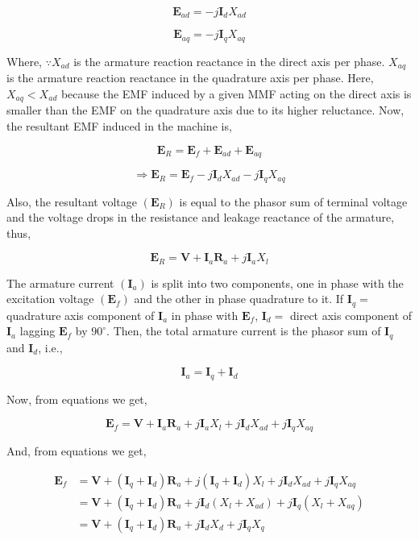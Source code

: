 \documentclass[main.tex]{subfiles}
\begin{document}
\begin{enumerate}
$$
\boldsymbol{E}_{a d}=-j \boldsymbol{I}_d X_{a d} 
$$

$$
\boldsymbol{E}_{a q}=-j \boldsymbol{I}_q X_{a q} 
$$

Where, $\because X_{a d}$ is the armature reaction reactance in the direct axis per phase.
$X_{a q}$ is the armature reaction reactance in the quadrature axis per phase.
Here, $X_{a q}<X_{a d}$ because the EMF induced by a given MMF acting on the direct axis is smaller than the EMF on the quadrature axis due to its higher reluctance.
Now, the resultant EMF induced in the machine is,

$$
\boldsymbol{E}_R=\boldsymbol{E}_f+\boldsymbol{E}_{a d}+\boldsymbol{E}_{a q}
$$

$$
\Rightarrow \boldsymbol{E}_R=\boldsymbol{E}_f-j \boldsymbol{I}_d X_{a d}-j \boldsymbol{I}_q X_{a q}
$$

Also, the resultant voltage $\left(\boldsymbol{E}_R\right)$ is equal to the phasor sum of terminal voltage and the voltage drops in the resistance and leakage reactance of the armature, thus,

$$
\boldsymbol{E}_R=\boldsymbol{V}+\boldsymbol{I}_a \boldsymbol{R}_a+j \boldsymbol{I}_a X_l
$$

The armature current $\left(\boldsymbol{I}_a\right)$ is split into two components, one in phase with the excitation voltage $\left(\boldsymbol{E}_f\right)$ and the other in phase quadrature to it.
If $\boldsymbol{I}_q=$ quadrature axis component of $\boldsymbol{I}_a$ in phase with $\boldsymbol{E}_f$, $\boldsymbol{I}_d=$ direct axis component of $\boldsymbol{I}_a$ lagging $\boldsymbol{E}_f$ by $90^{\circ}$. Then, the total armature current is the phasor sum of $\boldsymbol{I}_q$ and $\boldsymbol{I}_d$, i.e.,

$$
\boldsymbol{I}_a=\boldsymbol{I}_q+\boldsymbol{I}_d
$$

Now, from equations we get,

$$
\boldsymbol{E}_f=\boldsymbol{V}+\boldsymbol{I}_a \boldsymbol{R}_a+j \boldsymbol{I}_a X_l+j \boldsymbol{I}_d X_{ad}+j \boldsymbol{I}_q X_{aq} 
$$

And, from equations we get,

$$
\begin{aligned}
\boldsymbol{E}_f&=\boldsymbol{V}+\left(\boldsymbol{I}_q+\boldsymbol{I}_d\right) \boldsymbol{R}_a+j\left(\boldsymbol{I}_q+\boldsymbol{I}_d\right) X_l+j \boldsymbol{I}_d X_{a d}+j \boldsymbol{I}_q X_{a q}\\
&=\boldsymbol{V}+\left(\boldsymbol{I}_q+\boldsymbol{I}_d\right) \boldsymbol{R}_a+j \boldsymbol{I}_d\left(X_l+X_{a d}\right)+j \boldsymbol{I}_q\left(X_l+X_{a q}\right)\\
&=\boldsymbol{V}+\left(\boldsymbol{I}_q+\boldsymbol{I}_d\right) \boldsymbol{R}_a+j \boldsymbol{I}_d X_d+j \boldsymbol{I}_q X_q
\end{aligned}
$$


\end{enumerate}
\end{document}
